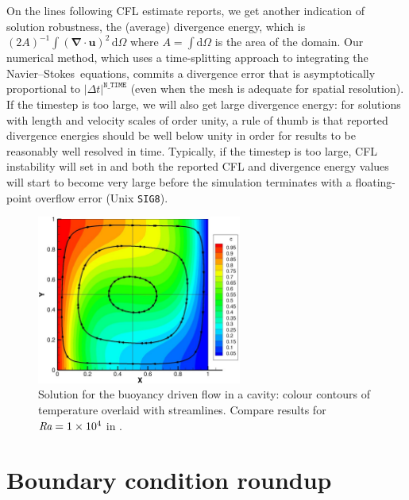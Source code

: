 \documentclass[11pt]{report}
\def\Ra{\mbox{\it Ra}}                              %
\newcommand\cd{\mathrm{d}} \newcommand\cD{\mathrm{D}}
\newcommand\NavSto{Navier--Stokes}
\begin{document}
On the lines following CFL estimate reports, we get another indication
of solution robustness, the (average) divergence energy, which is
$(2A)^{-1}\int (\bm{\nabla\cdot u})^2\, \cd \Omega$ where
$A=\int\cd\Omega$ is the area of the domain.  Our numerical method,
which uses a time-splitting approach to integrating the
\NavSto\ equations, commits a divergence error that is asymptotically
proportional to $|\Delta t|^\texttt{N\_TIME}$ (even when the mesh is
adequate for spatial resolution). If the timestep is too large, we
will also get large divergence energy: for solutions with length and
velocity scales of order unity, a rule of thumb is that reported
divergence energies should be well below unity in order for results to
be reasonably well resolved in time.  Typically, if the timestep is
too large, CFL instability will set in and both the reported CFL and
divergence energy values will start to become very large before the
simulation terminates with a floating-point overflow error (Unix
\verb|SIG8|).

\begin{figure}
\begin{center}
\includegraphics[width=0.6\textwidth]{tdrivcav}
\end{center}
\caption{
\label{fig.tdrivcav}
Solution for the buoyancy driven flow in a cavity: colour contours of
temperature overlaid with streamlines. Compare results for
$\Ra=1\times10^4$ in \citet{dvd83}. }
\end{figure}

\section{Boundary condition roundup}
\label{sec.bcs}
\end{document}
